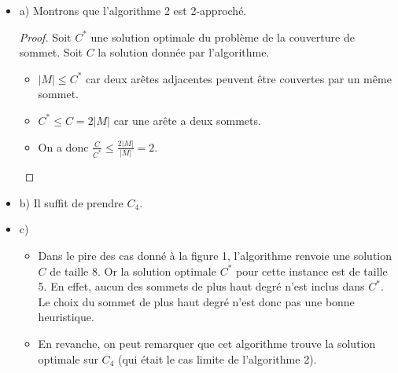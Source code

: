 \begin{itemize}
\item[] a) Montrons que l'algorithme 2 est 2-approché.
\begin{proof}
Soit $C^{*}$ une solution optimale du problème de la couverture de
sommet. Soit $C$ la solution donnée par l'algorithme. 
\begin{itemize}
\item[] $|M| \leq C^{*}$ car deux arêtes adjacentes peuvent être
  couvertes par un même sommet.
\item[] $C^{*} \leq C = 2 |M|$ car une arête a deux sommets.
\item[] On a donc $\frac{C}{C^{*}} \leq \frac{2|M|}{|M|} = 2$.
\end{itemize}
\end{proof}
\item[] b) Il suffit de prendre $C_4$.
\item[] c) 
\begin{itemize}
\item[] Dans le pire des cas donné à la figure 1, l'algorithme renvoie
  une solution $C$ de taille 8. Or la solution optimale $C^*$ pour cette
  instance est de taille 5. En effet, aucun des sommets de plus haut
  degré n'est inclus dans $C^{*}$. Le choix du sommet de plus haut
  degré n'est donc pas une bonne heuristique. 
\item[] En revanche, on peut remarquer que cet algorithme trouve la
  solution optimale sur $C_4$ (qui était le cas limite de l'algorithme 2).
\end{itemize}
\end{itemize}
